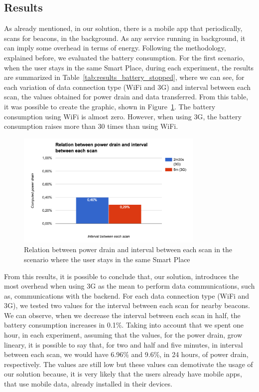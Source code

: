 \subsection{Results}
\label{sub:evaluation_energy_consumption_results}
As already mentioned, in our solution, there is a mobile app that periodically, scans for beacons, in the background.
As any service running in background, it can imply some overhead in terms of energy.
Following the methodology, explained before, we evaluated the battery consumption.
For the first scenario, when the user stays in the same Smart Place, during each experiment, the results are summarized in Table~\ref{tab:results_battery_stopped}, where we can see, for each variation of data connection type (\gls{WiFi} and \gls{3G}) and interval between each scan, the values obtained for power drain and data transferred.
From this table, it was possible to create the graphic, shown in Figure~\ref{fig:results_battery_stopped}.
The battery consumption using \gls{WiFi} is almost zero.
However, when using \gls{3G}, the battery consumption raises more than 30 times than using \gls{WiFi}.



\begin{figure}[!ht]
  \centering
    \includegraphics[width=0.8\textwidth, keepaspectratio]{images/results_battery_stopped}
    \caption[Power drain when the user does not move]{Relation between power drain and interval between each scan in the scenario where the user stays in the same Smart Place}
    \label{fig:results_battery_stopped}
\end{figure}

From this results, it is possible to conclude that, our solution, introduces the most overhead when using \gls{3G} as the mean to perform data communications, such as, communications with the backend.
For each data connection type (\gls{WiFi} and \gls{3G}), we tested two values for the interval between each scan for nearby beacons.
We can observe, when we decrease the interval between each scan in half, the battery consumption increases in 0.1\%.
Taking into account that we spent one hour, in each experiment, assuming that the values, for the power drain, grow lineary, it is possible to say that, for two and half and five minutes, in interval between each scan, we would have 6.96\% and 9.6\%, in 24 hours, of power drain, respectively.
The values are still low but these values can demotivate the usage of our solution because, it is very likely that the users already have mobile apps, that use mobile data, already installed in their devices.

